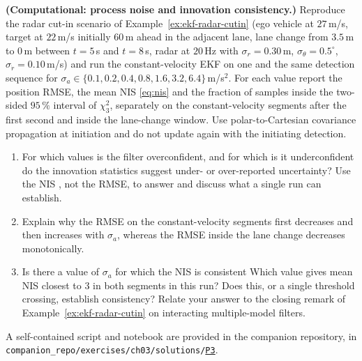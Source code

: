\documentclass[graybox,envcountchap]{style/SNmono}
\newcommand{\repopath}[1]{\texttt{#1}}
\providecommand{\DIFadd}[1]{{\protect\color{blue} #1}} %
\providecommand{\DIFdel}[1]{{\protect\color{red} #1}} %
\providecommand{\DIFaddbegin}{} %
\providecommand{\DIFaddend}{} %
\providecommand{\DIFdelbegin}{} %
\providecommand{\DIFdelend}{} %
\DeclareRobustCommand{\RtwoDel}[1]{{\color{red}%
  \renewcommand{\DIFadd}[1]{##1}\renewcommand{\DIFdel}[1]{##1}%
  #1}}
\DeclareRobustCommand{\RtwoAdd}[1]{{\color{blue}#1}}
\DeclareRobustCommand{\codeentry}[1]{\hyperref[code:#1]{\texttt{#1}}}
\begin{document}
\begin{prob}\label{prob:ch03:10}
\textbf{(Computational: process noise and innovation consistency.)} Reproduce the radar cut-in scenario of Example~\ref{ex:ekf-radar-cutin} (ego vehicle at $27$\,m/s, target at $22$\,m/s initially $60$\,m ahead in the adjacent lane, lane change from $3.5$\,m to $0$\,m between $t=5$\,s and $t=8$\,s, radar at $20$\,Hz with $\sigma_r=0.30$\,m, $\sigma_\theta=0.5^{\circ}$, $\sigma_{\dot r}=0.10$\,m/s) and run the constant-velocity EKF on one and the same detection sequence for $\sigma_a\in\{0.1,0.2,0.4,0.8,1.6,3.2,6.4\}$\,m/s$^{2}$. For each value report the position RMSE, the mean NIS \eqref{eq:nis} and the fraction of samples inside the two-sided $95\,\%$ interval of $\chi^{2}_{3}$, separately on the constant-velocity segments \DIFaddbegin \DIFadd{after the first second }\DIFaddend and inside the lane-change window. \DIFaddbegin \DIFadd{Use polar-to-Cartesian covariance propagation at initiation and do not update again with the initiating detection.
}\DIFaddend \begin{enumerate}
\item[(a)] For which values \DIFdelbegin \DIFdel{is the filter overconfident, and for which is it underconfident}\DIFdelend \DIFaddbegin \DIFadd{do the innovation statistics suggest under- or over-reported uncertainty}\DIFaddend ? Use the NIS \DIFdelbegin \DIFdel{, not the RMSE, to answer}\DIFdelend \DIFaddbegin \DIFadd{and discuss what a single run can establish}\DIFaddend .
\item[(b)] Explain why the RMSE on the constant-velocity segments first decreases and then increases with $\sigma_a$, whereas the RMSE inside the lane change decreases monotonically.
\item[(c)] \DIFdelbegin \DIFdel{Is there a value of $\sigma_a$ for which the NIS is consistent }\DIFdelend \DIFaddbegin \DIFadd{Which value gives mean NIS closest to $3$ }\DIFaddend in both segments \DIFaddbegin \DIFadd{in this run? Does this, or a single threshold crossing, establish consistency}\DIFaddend ? Relate your answer to the closing remark of Example~\ref{ex:ekf-radar-cutin} on interacting multiple-model filters.
\end{enumerate}
A self-contained script and notebook are provided in the companion repository, in \RtwoDel{\repopath{companion\_\allowbreak repo/\allowbreak exercises/\allowbreak ch03/\allowbreak solutions/}}\RtwoAdd{\codeentry{P3}}.
\end{prob}
\end{document}
